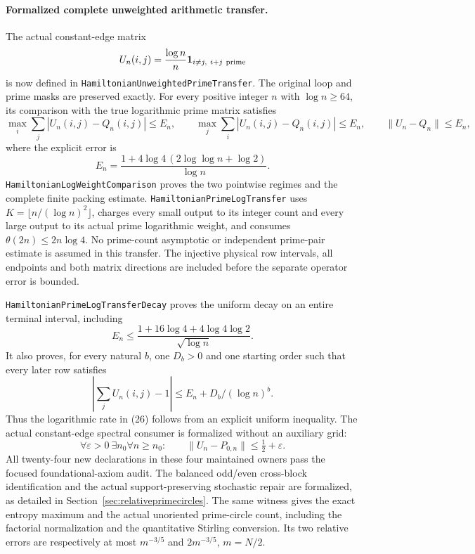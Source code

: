 \paragraph{Formalized complete unweighted arithmetic transfer.}
The actual constant-edge matrix
\[
 U_n(i,j)=\frac{\log n}{n}
      \mathbf1_{i\ne j,\ i+j\ {\rm prime}}
\]
is now defined in \texttt{HamiltonianUnweightedPrimeTransfer}.
The original loop and prime masks are preserved exactly.
For every positive integer \(n\) with \(\log n\geq64\), its
comparison with the true logarithmic prime matrix satisfies
\[
 \max_i\sum_j|U_n(i,j)-Q_n(i,j)|\leq E_n,\qquad
 \max_j\sum_i|U_n(i,j)-Q_n(i,j)|\leq E_n,\qquad
 \|U_n-Q_n\|\leq E_n,
\]
where the explicit error is
\[
 E_n=\frac{1+4\log4\,(2\log\log n+\log2)}{\log n}.
\]
\texttt{HamiltonianLogWeightComparison} proves the two
pointwise regimes and the complete finite packing estimate.
\texttt{HamiltonianPrimeLogTransfer} uses
\(K=\lfloor n/(\log n)^2\rfloor\), charges every small
output to its integer count and every large output to its
actual prime logarithmic weight, and consumes
\(\theta(2n)\leq2n\log4\).
No prime-count asymptotic or independent prime-pair estimate
is assumed in this transfer.
The injective physical row intervals, all endpoints and both
matrix directions are included before the separate operator
error is bounded.

\texttt{HamiltonianPrimeLogTransferDecay} proves the uniform
decay on an entire terminal interval, including
\[
 E_n\leq\frac{1+16\log4+4\log4\log2}{\sqrt{\log n}}.
\]
It also proves, for every natural \(b\), one \(D_b>0\)
and one starting order such that every later row satisfies
\[
 \left|\sum_jU_n(i,j)-1\right|
                   \leq E_n+D_b/(\log n)^b.
\]
Thus the logarithmic rate in (26) follows from an explicit
uniform inequality. The actual constant-edge spectral consumer
is formalized without an auxiliary grid:
\[
 \forall\varepsilon>0\ \exists n_0 \forall n\geq n_0:\qquad
 \|U_n-P_{0,n}\|\leq\tfrac12+\varepsilon .
\]
All twenty-four new declarations in these four maintained owners
pass the focused foundational-axiom audit.
The balanced odd/even cross-block identification and the actual
support-preserving stochastic repair are formalized, as detailed
in Section~\ref{sec:relativeprimecircles}. The same witness gives
the exact entropy maximum and the actual unoriented prime-circle
count, including the factorial normalization and the quantitative
Stirling conversion. Its two relative errors are respectively
at most \(m^{-3/5}\) and \(2m^{-3/5}\), \(m=N/2\).
